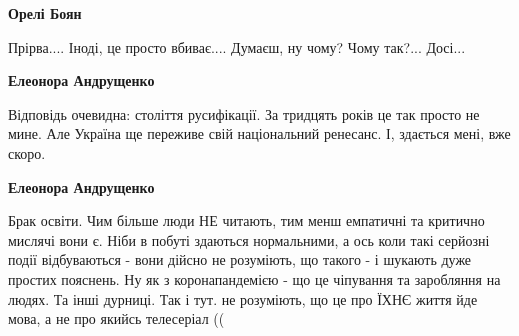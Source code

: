 \begin{itemize}
\begin{itemize}
\textbf{Орелі Боян}
\end{itemize}

 
Прірва.... Іноді, це просто вбиває.... Думаєш, ну чому? Чому так?... Досі...

\begin{itemize}
 
\textbf{Елеонора Андрущенко} 

Відповідь очевидна: століття русифікації. За тридцять років це так просто не
мине. Але Україна ще переживе свій національний ренесанс. І, здається мені, вже
скоро.


 
\textbf{Елеонора Андрущенко} 

Брак освіти. Чим більше люди НЕ читають, тим менш емпатичні та критично мислячі
вони є. Ніби в побуті здаються нормальними, а ось коли такі серйозні події
відбуваються - вони дійсно не розуміють, що такого - і шукають дуже простих
пояснень. Ну як з коронапандемією - що це чіпування та заробляння на людях. Та
інші дурниці. Так і тут. не розуміють, що це про ЇХНЄ життя йде мова, а не про
якийсь телесеріал ((

\end{itemize}

 


\begin{itemize}
 

\end{itemize}
\end{itemize}
